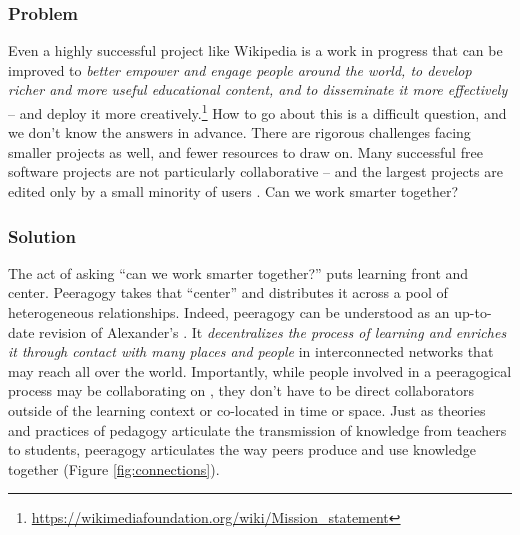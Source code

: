\subsubsection*{Problem} Even a highly successful project like Wikipedia is a work in progress that can be improved to \emph{\emph{better} empower and engage people around the world, to develop \emph{richer and more useful} educational content, and to disseminate it \emph{more} effectively} -- and deploy it more creatively.\footnote{\url{https://wikimediafoundation.org/wiki/Mission_statement}}  How to go about this is a difficult question, and we don't know the answers in advance.  There are rigorous challenges facing smaller projects as well, and fewer resources to draw on.  Many successful free software projects are not particularly collaborative -- and the largest projects are edited only by a small minority of users \cite{free-software-better,who-writes-wikipedia}.  Can we work smarter together?

\subsubsection*{Solution} The act of asking ``can we work smarter together?'' puts learning front and center.  Peeragogy takes that ``center'' and distributes it across a pool of heterogeneous relationships.  Indeed, peeragogy can be understood as an up-to-date revision of Alexander's  \cite[p. 99]{alexander1977pattern}.  It \emph{decentralizes the process of learning and enriches it through contact with many places and people} in interconnected networks that may reach all over the world.   Importantly, while people involved in a peeragogical process may be collaborating on , they don't have to be direct collaborators outside of the learning context or co-located in time or space.  Just as theories and practices of pedagogy articulate the transmission of knowledge from teachers to students, peeragogy articulates the way peers produce and use knowledge together (Figure \ref{fig:connections}).


